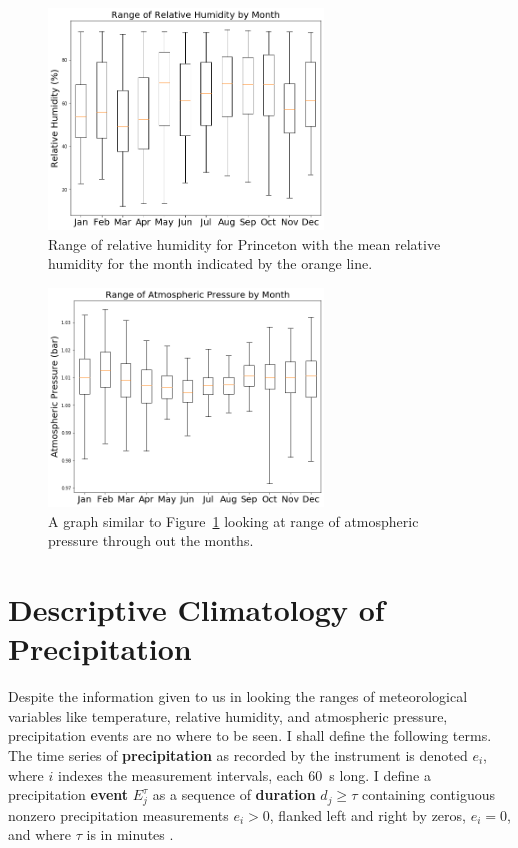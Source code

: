 \documentclass[11pt]{report}
\begin{document}
\begin{figure}[t]
	\centering
	\includegraphics[width=0.65\textwidth]{Figures/RH_range.png}
	\caption[Range of Relative Humidity in Princeton
          (2017--2021)]{\label{RH_range} Range of relative humidity for
          Princeton with the mean relative humidity for the month indicated
          by the orange line.}
\end{figure}
\begin{figure}[b]
	\centering
	\includegraphics[width=0.65\textwidth]{Figures/AP_range.png}
	\caption[Range of Atmospheric Pressure in Princeton (2017--2021)
        ]{\label{AP_range} A graph similar to Figure~\ref{RH_range} looking
          at range of atmospheric pressure through out the months.}
\end{figure}
\clearpage
\section{Descriptive Climatology of Precipitation}\label{sec:dcp}

Despite the information given to us in looking the ranges of meteorological
variables like temperature, relative humidity, and atmospheric pressure,
precipitation events are no where to be seen.  I shall define the following
terms. The time series of \textbf{precipitation} as recorded by the
instrument is denoted $e_i$, where $i$ indexes the measurement intervals,
each 60~s long. I define a precipitation \textbf{event} $E_j^\tau $ as a
sequence of \textbf{duration} $d_j\ge \tau$ containing contiguous nonzero
precipitation measurements $e_i>0$, flanked left and right by zeros,
$e_i=0$, and where $\tau$ is in minutes \cite[]{Eagleson}.
\end{document}
